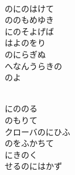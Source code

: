 \documentclass[10pt,b5j]{tarticle} %
\begin{document}
\vspace{1.5em} %
\newcommand{\linespace}{0.5em} %
\newcommand{\blocksize}{0.5\hsize} %
\newcommand{\itemmargin}{3em} %
\begin{enumerate} %
    \setlength{\itemindent}{\itemmargin} %
    \begin{minipage}[c]{\blocksize}
    
        \vspace{\linespace}
        \item~\\
        のにのはけて\\
        ののもめゆき\\
        にのそよげば\\
        はよのをり\\
        のにらぎぬ\\
        へなんうらきの\\
        のよ
        
    \end{minipage}
    \begin{minipage}[c]{\blocksize}
        
        \vspace{\linespace}
        \item~\\
        にののる\\
        のもりて\\
        クローバのにひふ\\
        のをふかちて\\
        にきのく\\
        せるのにはかず
        
    \end{minipage}
    \begin{minipage}[c]{\blocksize}
        

\end{minipage}
\end{enumerate}
\end{document}
